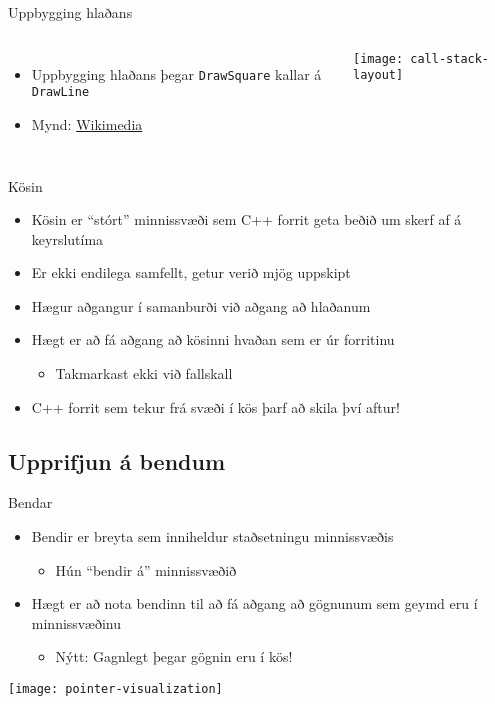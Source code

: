 \documentclass{beamer}
\begin{document}
\begin{frame}{Uppbygging hlaðans}
    \begin{columns}
        \begin{itemize}
            \item Uppbygging hlaðans þegar \texttt{DrawSquare} kallar á \texttt{DrawLine}
            \item Mynd: \href{https://en.wikipedia.org/wiki/File:Call\_stack\_layout.svg}{Wikimedia}
        \end{itemize}
        \texttt{[image: call-stack-layout]}
    \end{columns}
\end{frame}

\begin{frame}{Kösin}
    \begin{itemize}
        \item Kösin er ``stórt'' minnissvæði sem C++ forrit geta beðið um skerf af á keyrslutíma
        \item Er ekki endilega samfellt, getur verið mjög uppskipt 
        \item Hægur aðgangur í samanburði við aðgang að hlaðanum
        \item Hægt er að fá aðgang að kösinni hvaðan sem er úr forritinu
        \begin{itemize}
            \item Takmarkast ekki við fallskall
        \end{itemize}
        \item C++ forrit sem tekur frá svæði í kös þarf að skila því aftur!
    \end{itemize}
\end{frame}

\subsection{Upprifjun á bendum}

\begin{frame}{Bendar}
    \begin{itemize}
        \item Bendir er breyta sem inniheldur staðsetningu minnissvæðis
        \begin{itemize}
            \item Hún ``bendir á'' minnissvæðið
        \end{itemize}
        \item Hægt er að nota bendinn til að fá aðgang að gögnunum sem geymd eru í minnissvæðinu
        \begin{itemize}
            \item {\color{red} Nýtt}: Gagnlegt þegar gögnin eru í kös!
        \end{itemize}
    \end{itemize}
    
    \begin{center}
    \texttt{[image: pointer-visualization]}
    \end{center}
\end{frame}
\end{document}
